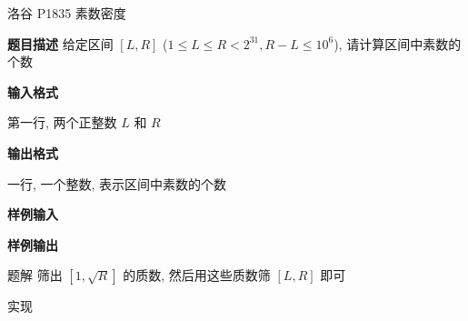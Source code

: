 \begin{frame}{洛谷 P1835 素数密度}
	\label{incexc:example:lgp1835}

	\textbf{题目描述} 给定区间 \([L,R]\) (\(1\leq L\leq R < 2^{31}, R-L\leq 10^6\)), 请计算区间中素数的个数

	\textbf{输入格式}

	第一行, 两个正整数 \(L\) 和 \(R\)

	\textbf{输出格式}

	一行, 一个整数, 表示区间中素数的个数

	\textbf{样例输入}


	\textbf{样例输出}

\end{frame}


\begin{frame}[fragile]{题解}
	筛出 \([1,\sqrt{R}]\) 的质数, 然后用这些质数筛 \([L,R]\) 即可
\end{frame}


\begin{frame}{实现}
\end{frame}

